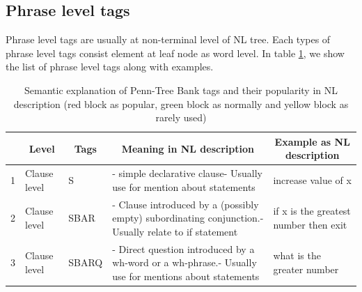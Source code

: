 \subsection{Phrase level tags}
Phrase level tags are usually at non-terminal level of NL tree. Each types of phrase level tags consist element at leaf node as word level. In table \ref{table:SummarizeAllTags}, we show the list of phrase level tags along with examples.
\begin{longtable}{|p{}|p{}|p{}|p{}|p{}|}
 \caption[]{Semantic explanation of Penn-Tree Bank tags and  their popularity in NL description (red block as popular, green block as normally and yellow block as rarely used)}
\label{table:SummarizeAllTags} \\
		\hline
		\rowcolor[HTML]{38FFF8} 
		\multicolumn{1}{|c|}{\cellcolor[HTML]{38FFF8}\textbf{No}} & \multicolumn{1}{c|}{\cellcolor[HTML]{38FFF8}\textbf{Level}} & \multicolumn{1}{c|}{\cellcolor[HTML]{38FFF8}\textbf{Tags}} & \multicolumn{1}{c|}{\cellcolor[HTML]{38FFF8}\textbf{Meaning in NL description}}                                 & \multicolumn{1}{c|}{\cellcolor[HTML]{38FFF8}\textbf{Example as NL description}} \\ \hline
		\rowcolor[HTML]{FFCCC9} 
		1                                                         & Clause level                                                & S                                                          & - simple declarative clause- Usually use for mention about statements                                           & increase value of x                                                             \\ \hline
		\rowcolor[HTML]{FFCCC9} 
		2                                                         & Clause level                                                & SBAR                                                       & - Clause introduced by a (possibly empty) subordinating conjunction.- Usually relate to if statement            & if x is the greatest number then exit                                           \\ \hline
		\rowcolor[HTML]{9AFF99} 
		3                                                         & Clause level                                                & SBARQ                                                      & - Direct question introduced by a wh-word or a wh-phrase.- Usually use for mentions about statements            & what is the greater number                                                      \\ \hline

\end{longtable}
